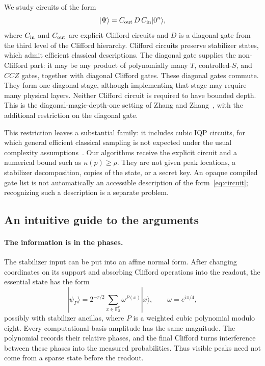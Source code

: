 \documentclass[a4paper,onecolumn,11pt,unpublished]{quantumarticle}
\theoremstyle{plain}
\theoremstyle{remark}
\newcommand{\F}{\mathbb{F}_2}
\newcommand{\ket}[1]{|#1\rangle}
\begin{document}
We study circuits of the form
\begin{equation}\label{eq:circuit}
\ket{\Psi}=C_{\rm out}\,D\,C_{\rm in}\ket{0^n},
\end{equation}
where $C_{\rm in}$ and $C_{\rm out}$ are explicit Clifford circuits and $D$ is a diagonal gate from the third level of the Clifford hierarchy. Clifford circuits preserve stabilizer states, which admit efficient classical descriptions. The diagonal gate supplies the non-Clifford part: it may be any product of polynomially many $T$, controlled-$S$, and $CCZ$ gates, together with diagonal Clifford gates. These diagonal gates commute. They form one diagonal stage, although implementing that stage may require many physical layers. Neither Clifford circuit is required to have bounded depth. This is the diagonal-magic-depth-one setting of Zhang and Zhang~\cite{ZZ24}, with the additional restriction on the diagonal gate.

This restriction leaves a substantial family: it includes cubic IQP circuits, for which general efficient classical sampling is not expected under the usual complexity assumptions~\cite{BJS11,BMS16}. Our algorithms receive the explicit circuit and a numerical bound such as $\kappa(p)\ge\rho$. They are not given peak locations, a stabilizer decomposition, copies of the state, or a secret key. An opaque compiled gate list is not automatically an accessible description of the form~\eqref{eq:circuit}; recognizing such a description is a separate problem.

\subsection{An intuitive guide to the arguments}

\paragraph{The information is in the phases.}
The stabilizer input can be put into an affine normal form. After changing coordinates on its support and absorbing Clifford operations into the readout, the essential state has the form
\[
\ket{\psi_P}=2^{-r/2}\sum_{x\in\F^r}\omega^{P(x)}\ket{x},
\qquad \omega=e^{i\pi/4},
\]
possibly with stabilizer ancillas, where $P$ is a weighted cubic polynomial modulo eight. Every computational-basis amplitude has the same magnitude. The polynomial records their relative phases, and the final Clifford turns interference between these phases into the measured probabilities. Thus visible peaks need not come from a sparse state before the readout.
\end{document}
